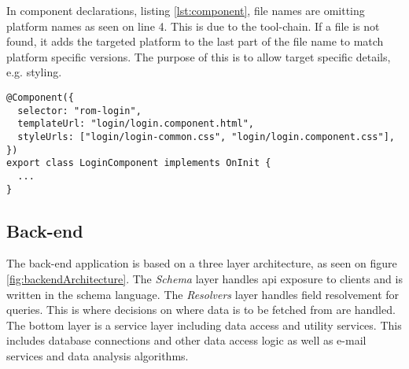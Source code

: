 In  component declarations, listing \ref{lst:component}, file names are omitting platform names as seen on line 4.
This is due to the  tool-chain.
If a file is not found, it adds the targeted platform to the last part of the file name to match platform specific versions.
The purpose of this is to allow target specific details, e.g. styling.

\begin{lstlisting}[caption=Login component declaration, label=lst:component]
@Component({
  selector: "rom-login",
  templateUrl: "login/login.component.html",
  styleUrls: ["login/login-common.css", "login/login.component.css"],
})
export class LoginComponent implements OnInit {
  ...
}
\end{lstlisting}

\subsection{Back-end}
The back-end application is based on a three layer architecture, as seen on figure \ref{fig:backendArchitecture}.
The \textit{Schema} layer handles \gls{api} exposure to clients and is written in the  schema language.
The \textit{Resolvers} layer handles field resolvement for queries.
This is where decisions on where data is to be fetched from are handled.
The bottom layer is a service layer including data access and utility services.
This includes database connections and other data access logic as well as e-mail services and data analysis algorithms.

